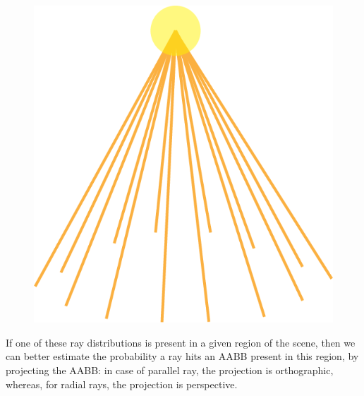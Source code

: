 \documentclass[11pt,a4paper,twocolumn]{article}
\begin{document}
\begin{figure}[H]
{        \includegraphics[width=\textwidth*\real{0.15}]{Images/point_light_rays.png} 
    }
    \label{fig:ray_distributions}
\end{figure} 

If one of these ray distributions is present in a given region of the scene, then we can better estimate the probability a ray hits an AABB present in this region, by projecting the AABB: in case of parallel ray, the projection is orthographic, whereas, for radial rays, the projection is perspective.
\end{document}
